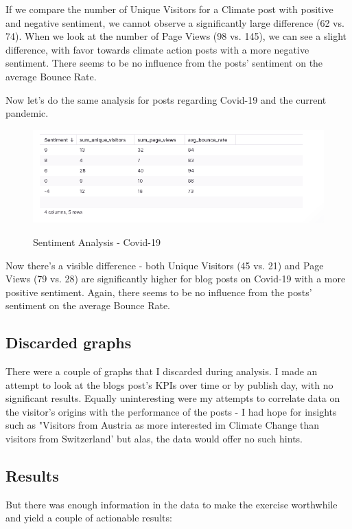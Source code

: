 If we compare the number of Unique Visitors for a Climate post with positive and negative sentiment, we cannot observe a significantly large difference (62 vs. 74). When we look at the number of Page Views (98 vs. 145), we can see a slight difference, with favor towards climate action posts with a more negative sentiment. There seems to be no influence from the posts' sentiment on the average Bounce Rate.

Now let's do the same analysis for posts regarding Covid-19 and the current pandemic.

\begin{figure}[H]
\centering
\caption {Sentiment Analysis - Covid-19}
\includegraphics[width=\linewidth]{images/analysis-sentiment-covid.png}
\label{fig:sentimentCovid}
\end{figure}

Now there's a visible difference - both Unique Visitors (45 vs. 21) and Page Views (79 vs. 28) are significantly higher for blog posts on Covid-19 with a more positive sentiment. Again, there seems to be no influence from the posts' sentiment on the average Bounce Rate.

\subsection{Discarded graphs}

There were a couple of graphs that I discarded during analysis. I made an attempt to look at the blogs post's KPIs over time or by publish day, with no significant results. Equally uninteresting were my attempts to correlate data on the visitor's origins with the performance of the posts - I had hope for insights such as "Visitors from Austria as more interested im Climate Change than visitors from Switzerland' but alas, the data would offer no such hints.

\subsection{Results}

But there was enough information in the data to make the exercise worthwhile and yield a couple of actionable results:

